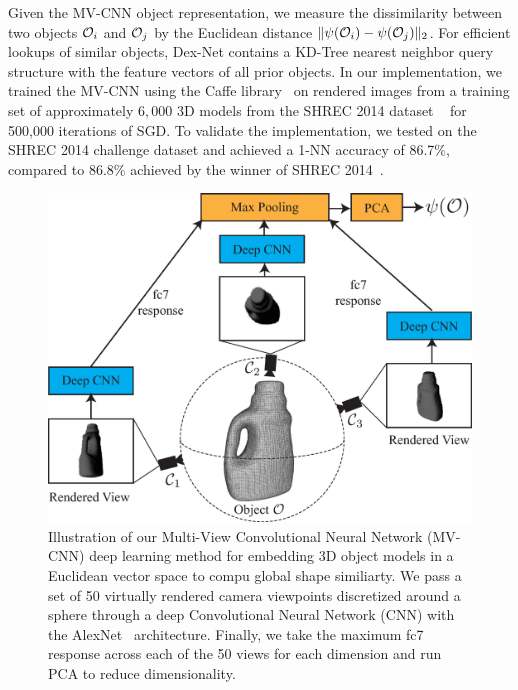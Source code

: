 Given the MV-CNN object representation, we measure the dissimilarity between two objects $\mathcal{O}_i$ and $\mathcal{O}_j$ by the Euclidean distance $\| \psi(\mathcal{O}_i) - \psi(\mathcal{O}_j) \|_2$.
For efficient lookups of similar objects, Dex-Net contains a KD-Tree nearest neighbor query structure with the feature vectors of all prior objects.
In our implementation, we trained the MV-CNN using the Caffe library~\cite{jia2014caffe} on rendered images from a training set of approximately $6,000$ 3D models from the SHREC 2014 dataset ~\cite{li2015comparison} for 500,000 iterations of SGD.
To validate the implementation, we tested on the SHREC 2014 challenge dataset and achieved a 1-NN accuracy of 86.7\%, compared to 86.8\% achieved by the winner of SHREC 2014~\cite{li2015comparison}.

\begin{figure}[t!]
\centering
\includegraphics[scale=0.275]{figures/illustrations/cnn_model.eps}
\caption{Illustration of our Multi-View Convolutional Neural Network (MV-CNN) deep learning method for embedding 3D object models in a Euclidean vector space to compu global shape similiarty. We pass a set of 50 virtually rendered camera viewpoints discretized around a sphere through a deep Convolutional Neural Network (CNN) with the AlexNet~\cite{krizhevsky2012imagenet} architecture. Finally, we take the maximum fc7 response across each of the 50 views for each dimension and run PCA to reduce dimensionality.}
\vspace*{-15pt}
\end{figure}

